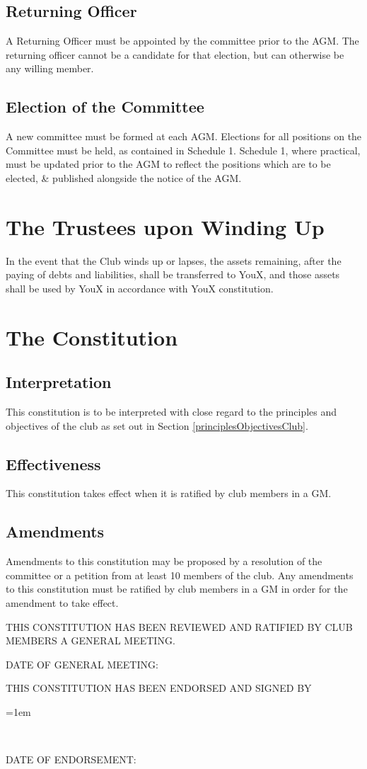 \documentclass[11pt]{article}
\newcommand{\signature}[2]{%
    \hsize=6cm%
    \parindent=1em%
    \vspace*{2em}%
    \begingroup%
    \par\noindent\makebox[\hsize]{\hrulefill}%
    \par\noindent\makebox[\hsize][l]{\indent #1}%
    \\ \noindent\makebox[\hsize][l]{\indent #2}%
    \endgroup%
}
\begin{document}
\subsection{Returning Officer}
A Returning Officer must be appointed by the committee prior to the AGM. The returning officer cannot be a candidate for that election, but can otherwise be any willing member.
\subsection{Election of the Committee}
A new committee must be formed at each AGM. Elections for all positions on the Committee must be held, as contained in Schedule 1. Schedule 1, where practical, must be updated prior to the AGM to reflect the positions which are to be elected, \& published alongside the notice of the AGM.

\section{The Trustees upon Winding Up}
In the event that the Club winds up or lapses, the assets remaining, after the paying of debts and liabilities, shall be transferred to YouX, and those assets shall be used by YouX in accordance with YouX constitution.

\section{The Constitution}
\subsection{Interpretation}
This constitution is to be interpreted with close regard to the principles and objectives of the club as set out in Section \ref{principlesObjectivesClub}.
\subsection{Effectiveness}
This constitution takes effect when it is ratified by club members in a GM.
\subsection{Amendments}
Amendments to this constitution may be proposed by a resolution of the committee or a petition from at least 10 members of the club. Any amendments to this constitution must be ratified by club members in a GM in order for the amendment to take effect.

\setlength{\parindent}{0pt}
\vfill
THIS CONSTITUTION HAS BEEN REVIEWED AND RATIFIED BY CLUB MEMBERS A GENERAL MEETING.

\vspace{0.5cm}
DATE OF GENERAL MEETING:\framebox[5cm]{\rule{0pt}{10pt}}

\vspace{1cm}
THIS CONSTITUTION HAS BEEN ENDORSED AND SIGNED BY
\vspace{1cm}


\signature{INSERT NAME}{INSERT TITLE}

\vspace{0.5cm}
DATE OF ENDORSEMENT: \framebox[5cm]{\rule{0pt}{10pt}}
\end{document}
